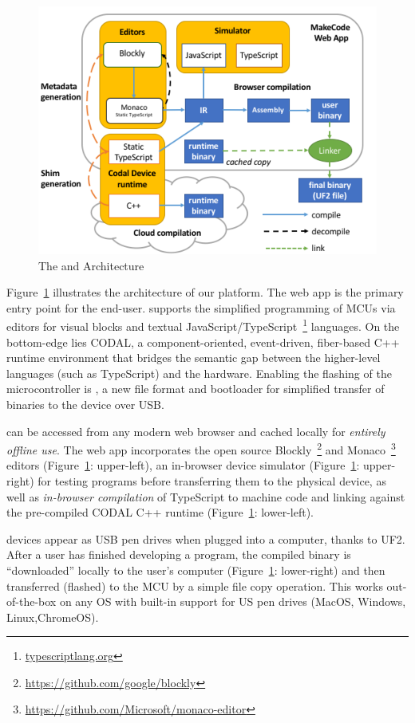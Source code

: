 \begin{figure}[t]
    \includegraphics[width=\columnwidth]{images/arch-diagram.png}
    \setlength{\belowcaptionskip}{-10pt}
    \caption{\label{fig:makecode}The \MC and \CO Architecture}
\end{figure}

Figure~\ref{fig:makecode} illustrates the architecture of our platform.
The \MC web app is the primary entry point for the end-user. \MC supports 
the simplified programming of MCUs via editors for visual blocks and textual JavaScript/TypeScript~\footnote{\url{typescriptlang.org}} languages. 
On the bottom-edge lies CODAL, a component-oriented, event-driven, fiber-based C++ runtime environment that bridges the semantic gap between the higher-level languages (such
as TypeScript) and the hardware. Enabling the flashing of the microcontroller is \UF, 
a new file format and bootloader for simplified transfer of binaries to the device over USB.

\MC can be accessed from any modern web browser and cached locally for \emph{entirely offline use}. The \MC web app incorporates the open source Blockly~\footnote{\url{https://github.com/google/blockly}} and Monaco~\footnote{\url{https://github.com/Microsoft/monaco-editor}} editors (Figure~\ref{fig:makecode}: upper-left), an in-browser device simulator (Figure~\ref{fig:makecode}: upper-right) for testing programs before transferring them to the physical device, as well as \emph{in-browser compilation} of TypeScript to machine code and linking against the pre-compiled
CODAL C++ runtime (Figure~\ref{fig:makecode}: lower-left).

\MC devices appear as USB pen drives when plugged into a computer, thanks to UF2. After a user has finished developing a program, the compiled binary is ``downloaded'' locally to the user's computer (Figure~\ref{fig:makecode}: lower-right) and then transferred (flashed) to the MCU by a simple file copy operation. This works out-of-the-box on any OS with built-in support for US pen drives (MacOS, Windows, Linux,ChromeOS).

